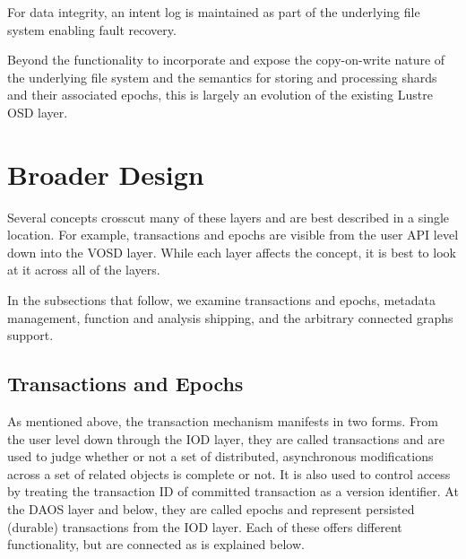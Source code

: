 \documentclass[conference]{IEEEtran}
\begin{document}
For data integrity, an intent log is maintained as part of the underlying file
system enabling fault recovery.

Beyond the functionality to incorporate and expose the copy-on-write nature
of the underlying file system and the semantics for storing and processing
shards and their associated epochs, this is largely an evolution of the
existing Lustre OSD layer.

\section{Broader Design}
\label{sec:broader}

Several concepts crosscut many of these layers and are best described in a
single location. For example, transactions and epochs are visible from the
user API level down into the VOSD layer. While each layer affects the concept,
it is best to look at it across all of the layers.

In the subsections that follow, we examine transactions and epochs, metadata
management, function and analysis shipping, and the arbitrary connected graphs
support.

\subsection{Transactions and Epochs}
\label{sec:transactions}

As mentioned above, the transaction mechanism manifests in two forms. From the
user level down through the IOD layer, they are called transactions and are
used to judge whether or not a set of distributed, asynchronous modifications
across a set of related objects is complete or not.  It is also used to control
access by treating the transaction ID of committed transaction as a version
identifier.  At the DAOS layer and below, they are called epochs and represent
persisted (durable) transactions from the IOD layer. Each of these offers
different functionality, but are connected as is explained below.
\end{document}
